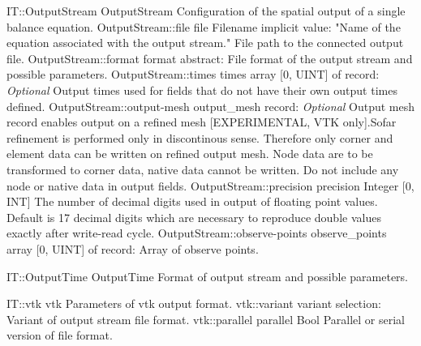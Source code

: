 \begin{RecordType}
	{IT::OutputStream}
	{OutputStream}
	{}%
	{}%
	{{{Configuration of the spatial output of a single balance equation.}%
}}
		\RecKey
			{OutputStream::file}
			{file}
			{{Filename}}{}
			{implicit value: "{Name of the equation associated with the output stream.}"}
			{{{File path to the connected output file.}%
}}
		\RecKey
			{OutputStream::format}
			{format}
			{{abstract: }}{}
			{ \ValueDefault{{\{}{\}}}}
			{{{File format of the output stream and possible parameters.}%
}}
		\RecKey
			{OutputStream::times}
			{times}
			{{array [0, UINT] of }{record: }}{}
			{ \it{Optional}}
			{{{Output times used for fields that do not have their own output times defined.}%
}}
		\RecKey
			{OutputStream::output-mesh}
			{output{\_}mesh}
			{{record: }}{}
			{ \it{Optional}}
			{{{Output mesh record enables output on a refined mesh [EXPERIMENTAL, VTK only].Sofar refinement is performed only in discontinous sense.
Therefore only corner and element data can be written on refined output mesh.
Node data are to be transformed to corner data, native data cannot be written.
Do not include any node or native data in output fields.}%
}}
		\RecKey
			{OutputStream::precision}
			{precision}
			{{Integer [0, INT]}}{}
			{ }
			{{{The number of decimal digits used in output of floating point values.}\\{
Default is 17 decimal digits which are necessary to reproduce double values exactly after write-read cycle.}%
}}
		\RecKey
			{OutputStream::observe-points}
			{observe{\_}points}
			{{array [0, UINT] of }{record: }}{}
			{ \ValueDefault{[]}}
			{{{Array of observe points.}%
}}
\end{RecordType}
\begin{AbstractType}
	{IT::OutputTime}
	{OutputTime}
	{}
	{{{Format of output stream and possible parameters.}%
}}
\end{AbstractType}
\begin{RecordType}
	{IT::vtk}
	{vtk}
	{}%
	{}%
	{{{Parameters of vtk output format.}%
}}
		\RecKey
			{vtk::variant}
			{variant}
			{{selection: }}{}
			{ }
			{{{Variant of output stream file format.}%
}}
		\RecKey
			{vtk::parallel}
			{parallel}
			{{Bool}}{}
			{ }
			{{{Parallel or serial version of file format.}%
}}
\end{RecordType}
